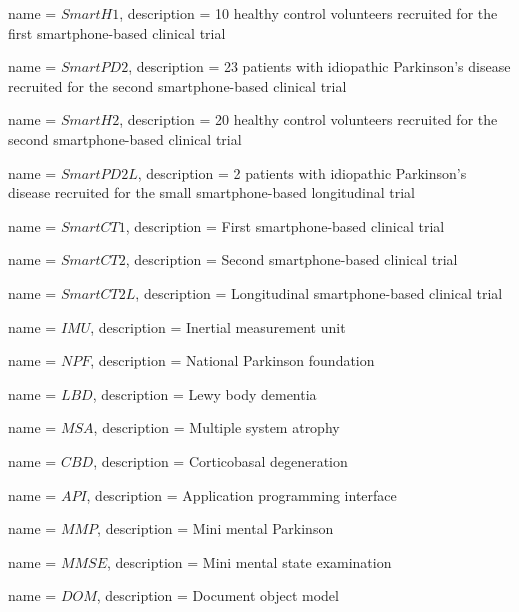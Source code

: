 {
	name = $SmartH1$, 
	description = 10 healthy control volunteers recruited for the first smartphone-based clinical trial
}

{
	name = $SmartPD2$, 
	description = 23 patients with idiopathic Parkinson's disease recruited for the second smartphone-based clinical trial
}

{
	name = $SmartH2$, 
	description = 20 healthy control volunteers recruited for the second smartphone-based clinical trial
}

{
	name = $SmartPD2L$, 
	description = 2 patients with idiopathic Parkinson's disease recruited for the small smartphone-based longitudinal trial
}

{
	name = $SmartCT1$, 
	description = First smartphone-based clinical trial
}

{
	name = $SmartCT2$, 
	description = Second smartphone-based clinical trial
}

{
	name = $SmartCT2L$, 
	description = Longitudinal smartphone-based clinical trial
}

{
	name = $IMU$, 
	description = Inertial measurement unit
}

{
	name = $NPF$, 
	description = National Parkinson foundation
}

{
	name = $LBD$, 
	description = Lewy body dementia
}

{
	name = $MSA$, 
	description = Multiple system atrophy
}

{
	name = $CBD$, 
	description = Corticobasal degeneration
}

{
	name = $API$, 
	description = Application programming interface
}

{
	name = $MMP$, 
	description = Mini mental Parkinson
}

{
	name = $MMSE$, 
	description = Mini mental state examination
}

{
	name = $DOM$, 
	description = Document object model
}

\makenoidxglossaries